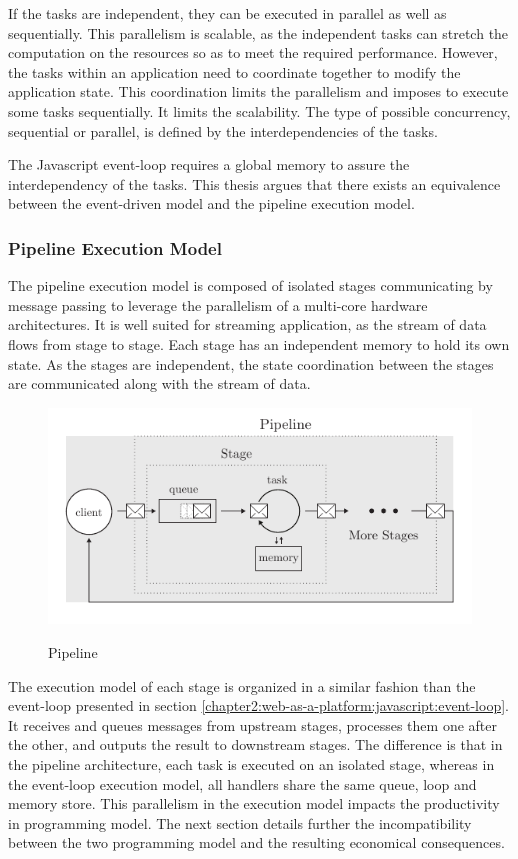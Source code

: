 If the tasks are independent, they can be executed in parallel as well as sequentially.
This parallelism is scalable, as the independent tasks can stretch the computation on the resources so as to meet the required performance.
However, the tasks within an application need to coordinate together to modify the application state.
This coordination limits the parallelism and imposes to execute some tasks sequentially.
It limits the scalability.
The type of possible concurrency, sequential or parallel, is defined by the interdependencies of the tasks.

The Javascript event-loop requires a global memory to assure the interdependency of the tasks.
This thesis argues that there exists an equivalence between the event-driven model and the pipeline execution model.

\subsubsection{Pipeline Execution Model}

The pipeline execution model is composed of isolated stages communicating by message passing to leverage the parallelism of a multi-core hardware architectures.
It is well suited for streaming application, as the stream of data flows from stage to stage.
Each stage has an independent memory to hold its own state.
As the stages are independent, the state coordination between the stages are communicated along with the stream of data.

\begin{figure}[h!]
  \centering
  \includegraphics[width=0.8\linewidth]{../resources/pipeline.pdf}
  \label{fig:pipeline}
  \caption{Pipeline}
\end{figure}

The execution model of each stage is organized in a similar fashion than the event-loop presented in section \ref{chapter2:web-as-a-platform:javascript:event-loop}.
It receives and queues messages from upstream stages, processes them one after the other, and outputs the result to downstream stages.
The difference is that in the pipeline architecture, each task is executed on an isolated stage, whereas in the event-loop execution model, all handlers share the same queue, loop and memory store.
This parallelism in the execution model impacts the productivity in programming model.
The next section details further the incompatibility between the two programming model and the resulting economical consequences.

